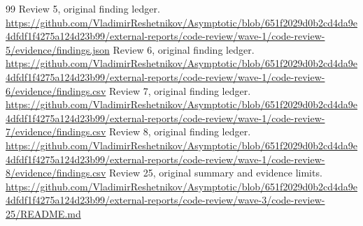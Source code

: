 \documentclass[11pt,a4paper]{article}
\begin{document}
\begin{thebibliography}{99}
 Review 5, original finding ledger.\newline
\url{https://github.com/VladimirReshetnikov/Asymptotic/blob/651f2029d0b2cd4da9e4dfdf1f4275a124d23b99/external-reports/code-review/wave-1/code-review-5/evidence/findings.json}
 Review 6, original finding ledger.\newline
\url{https://github.com/VladimirReshetnikov/Asymptotic/blob/651f2029d0b2cd4da9e4dfdf1f4275a124d23b99/external-reports/code-review/wave-1/code-review-6/evidence/findings.csv}
 Review 7, original finding ledger.\newline
\url{https://github.com/VladimirReshetnikov/Asymptotic/blob/651f2029d0b2cd4da9e4dfdf1f4275a124d23b99/external-reports/code-review/wave-1/code-review-7/evidence/findings.csv}
 Review 8, original finding ledger.\newline
\url{https://github.com/VladimirReshetnikov/Asymptotic/blob/651f2029d0b2cd4da9e4dfdf1f4275a124d23b99/external-reports/code-review/wave-1/code-review-8/evidence/findings.csv}
 Review 25, original summary and evidence limits.\newline
\url{https://github.com/VladimirReshetnikov/Asymptotic/blob/651f2029d0b2cd4da9e4dfdf1f4275a124d23b99/external-reports/code-review/wave-3/code-review-25/README.md}
\end{thebibliography}
\end{document}
